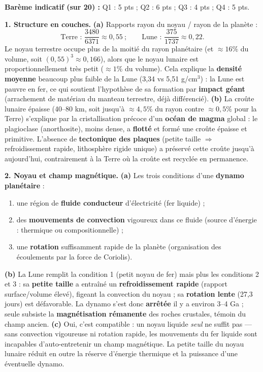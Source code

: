 \documentclass[11pt]{article}
\begin{document}
\begin{corrige}
\textbf{Barème indicatif (sur 20) :} Q1 : 5 pts ; Q2 : 6 pts ; Q3 : 4 pts ; Q4 : 5 pts.

\textbf{1. Structure en couches.}
\textbf{(a)} Rapports rayon du noyau / rayon de la planète :
\[ \text{Terre : } \frac{3480}{6371} \approx 0{,}55 \ ; \qquad \text{Lune : } \frac{375}{1737} \approx 0{,}22. \]
Le noyau terrestre occupe plus de la moitié du rayon planétaire (et $\approx 16\%$ du volume, soit $(0{,}55)^3 \approx 0{,}166$), alors que le noyau lunaire est proportionnellement très petit ($\approx 1\%$ du volume). Cela explique la \textbf{densité moyenne} beaucoup plus faible de la Lune (3,34 vs 5,51 g/cm$^3$) : la Lune est pauvre en fer, ce qui soutient l'hypothèse de sa formation par \textbf{impact géant} (arrachement de matériau du manteau terrestre, déjà différencié).
\textbf{(b)} La croûte lunaire épaisse (40--80 km, soit jusqu'à $\approx 4,5\%$ du rayon contre $\approx 0,5\%$ pour la Terre) s'explique par la cristallisation précoce d'un \textbf{océan de magma} global : le plagioclase (anorthosite), moins dense, a \textbf{flotté} et formé une croûte épaisse et primitive. L'absence de \textbf{tectonique des plaques} (petite taille $\Rightarrow$ refroidissement rapide, lithosphère rigide unique) a préservé cette croûte jusqu'à aujourd'hui, contrairement à la Terre où la croûte est recyclée en permanence.

\textbf{2. Noyau et champ magnétique.}
\textbf{(a)} Les trois conditions d'une \textbf{dynamo planétaire} :
\begin{enumerate}
    \item une région de \textbf{fluide conducteur} d'électricité (fer liquide) ;
    \item des \textbf{mouvements de convection} vigoureux dans ce fluide (source d'énergie : thermique ou compositionnelle) ;
    \item une \textbf{rotation} suffisamment rapide de la planète (organisation des écoulements par la force de Coriolis).
\end{enumerate}
\textbf{(b)} La Lune remplit la condition 1 (petit noyau de fer) mais plus les conditions 2 et 3 : sa \textbf{petite taille} a entraîné un \textbf{refroidissement rapide} (rapport surface/volume élevé), figeant la convection du noyau ; sa \textbf{rotation lente} (27,3 jours) est défavorable. La dynamo s'est donc \textbf{arrêtée} il y a environ 3--4 Ga ; seule subsiste la \textbf{magnétisation rémanente} des roches crustales, témoin du champ ancien.
\textbf{(c)} Oui, c'est compatible : un noyau liquide \emph{seul} ne suffit pas --- sans convection vigoureuse ni rotation rapide, les mouvements du fer liquide sont incapables d'auto-entretenir un champ magnétique. La petite taille du noyau lunaire réduit en outre la réserve d'énergie thermique et la puissance d'une éventuelle dynamo.


\end{corrige}
\end{document}
